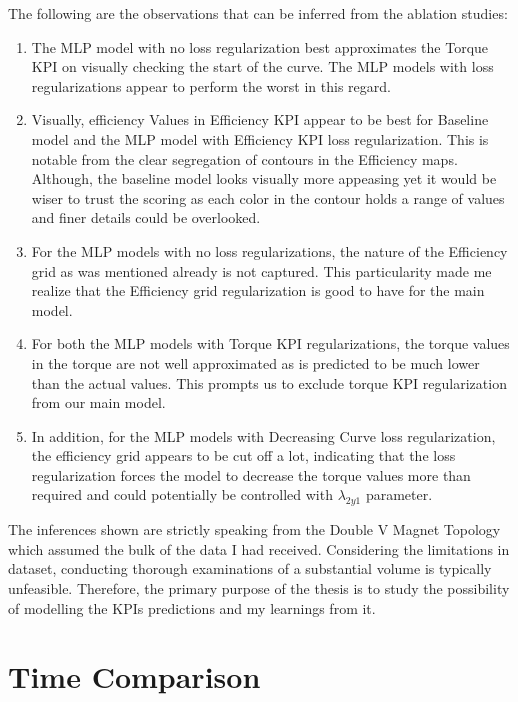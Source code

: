 \documentclass{report} %
\begin{document}
The following are the observations that can be inferred from the ablation studies:
\begin{enumerate}[nosep]
    \item The \ac{MLP} model with no loss regularization best approximates the Torque \ac{KPI} on visually checking the start of the curve.
    The \ac{MLP} models with loss regularizations appear to perform the worst in this regard.
    \item Visually, efficiency Values in Efficiency \ac{KPI} appear to be best for Baseline model and the \ac{MLP} model with Efficiency \ac{KPI} loss regularization.
    This is notable from the clear segregation of contours in the Efficiency maps. Although, the baseline model looks visually more appeasing yet it would be 
    wiser to trust the scoring as each color in the contour holds a range of values and finer details could be overlooked.
    \item For the \ac{MLP} models with no loss regularizations, the nature of the Efficiency grid as was mentioned already is not captured. 
    This particularity made me realize that the Efficiency grid regularization is good to have for the main model.
    \item For both the \ac{MLP} models with Torque \ac{KPI} regularizations, the torque values in the torque are not well approximated as is predicted to be much lower 
    than the actual values. This prompts us to exclude torque \ac{KPI} regularization from our main model.
    \item In addition, for the \ac{MLP} models with Decreasing Curve loss regularization, the efficiency grid appears to be cut off a lot, indicating that the 
    loss regularization forces the model to decrease the torque values more than required and could potentially be controlled with \textit{$\lambda_{2y1}$} parameter.\\
\end{enumerate}

The inferences shown are strictly speaking from the Double V Magnet Topology which assumed the bulk of the data I had received.
Considering the limitations in dataset, conducting thorough examinations of a substantial volume is typically unfeasible. 
Therefore, the primary purpose of the thesis is to study the possibility of modelling the \ac{KPI}s predictions and my learnings from it.

\section{Time Comparison}\label{sec:Time Comparison}
\end{document}
